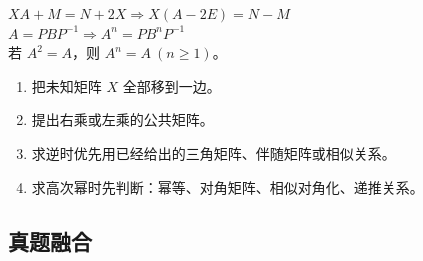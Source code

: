 ﻿\documentclass[11pt,a4paper,UTF8]{ctexart}
\begin{document}
\begin{identifybox}[高亮公式]
$XA+M=N+2X \Rightarrow X(A-2E)=N-M$\\
$A=PBP^{-1}\Rightarrow A^n=PB^nP^{-1}$\\
若 $A^2=A$，则 $A^n=A\ (n\ge1)$。\\
\end{identifybox}

\begin{templatebox}[考场模板]

\begin{enumerate}
\item 把未知矩阵 $X$ 全部移到一边。
\item 提出右乘或左乘的公共矩阵。
\item 求逆时优先用已经给出的三角矩阵、伴随矩阵或相似关系。
\item 求高次幂时先判断：幂等、对角矩阵、相似对角化、递推关系。
\end{enumerate}

\end{templatebox}
\subsection{真题融合}
\end{document}
